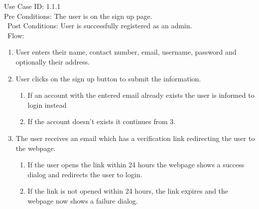 Use Case ID: 1.1.1\\ 
Pre Conditions: The user is on the sign up page.\\\
Post Conditions: User is successfully registered as an admin.\\\
Flow: 
\begin{enumerate}
    \item User enters their name, contact number, email, username, password and optionally their address. 
    \item User clicks on the sign up button to submit the information. 
    \begin{enumerate}
        \item If an account with the entered email already exists the user is informed to login instead
        \item If the account doesn't exists it continues from 3.
    \end{enumerate}
    \item The user receives an email which has a verification link redirecting the user to the webpage.
    \begin{enumerate}
        \item If the user opens the link within 24 hours the webpage shows a success dialog and redirects the user to login.
        \item If the link is not opened within 24 hours, the link expires and the webpage now shows a failure dialog.
    \end{enumerate}
\end{enumerate}
